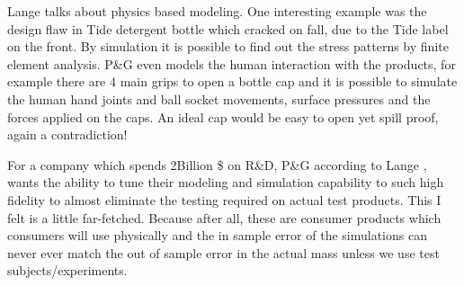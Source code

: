 \documentclass[a4paper,12 pt]{article}
\begin{document}
Lange talks about physics based modeling. One interesting example was the design flaw in Tide detergent bottle which cracked on fall, due to the Tide label on the front. By simulation it is possible to find out the stress patterns by finite element analysis. P\&G even models the human interaction with the products, for example there are 4 main grips to open a bottle cap and it is possible to simulate the human hand joints and ball socket movements, surface pressures and the forces applied on the caps. An ideal cap would be easy to open yet spill proof, again a contradiction!

For a company which spends 2Billion \$ on R\&D, P\&G according to Lange , wants the ability to tune their modeling and simulation capability to such high fidelity to almost eliminate the testing required on actual test products. This I felt is a little far-fetched. Because after all, these are  consumer products which consumers will use physically and the in sample error of the simulations can never ever match the out of sample error in the actual mass unless we use test subjects/experiments.
\end{document}
